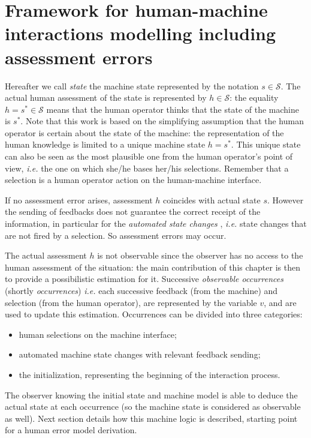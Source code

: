 \section{Framework for human-machine interactions modelling including assessment errors}
Hereafter we call {\em state} the machine state 
represented by the notation $s \in \mathcal{S}$.
The actual human assessment of the state is represented 
by $h\in \mathcal{S}$: the equality 
$h={s}^{*} \in \mathcal{S}$ means that the human operator 
thinks that the state of the machine is $s^{*}$. Note that this work is based 
on the simplifying assumption that the human operator 
is certain about the state of the machine: the representation 
of the human knowledge is limited to a unique machine state 
$h=s^*$. This unique state can also be seen as the most 
plausible one from the human operator's point of view, 
\textit{i.e.} the one on which she/he bases her/his selections.
Remember that a selection is a human operator action on 
the human-machine interface.

If no assessment error arises, assessment $h$ coincides 
with actual state $s$. However the sending of feedbacks 
does not guarantee the correct receipt of the information, 
in particular for the \textit{automated state changes} \cite{feary05}, \textit{i.e.} state changes that are not fired by a selection. So assessment errors may occur.

The actual assessment $h$ is not observable since 
the observer has no access to the human assessment of the situation: 
the main contribution of this chapter 
is then to provide a possibilistic estimation for it. 
Successive \textit{observable occurrences} (shortly \textit{occurrences}) 
\textit{i.e.} each successive feedback (from the machine) 
and selection (from the human operator), 
are represented by the variable $v$, 
and are used to update this estimation. 
Occurrences can be divided into three categories:
\begin{itemize} 
\item human selections on the machine interface;
\item automated machine state changes with relevant feedback sending;
\item the initialization, representing the beginning of the interaction process.
\end{itemize}
The observer knowing the initial state and machine model
is able to deduce the actual state at each occurrence 
(so the machine state is considered as observable as well). Next section details
how this machine logic is described, starting point for a 
human error model derivation.


